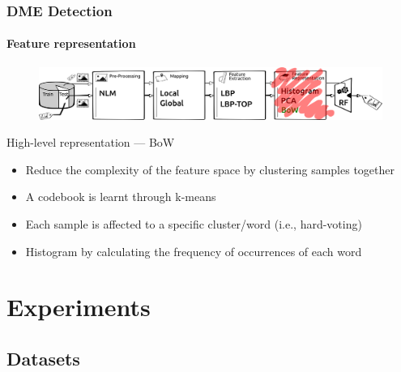 \documentclass{beamer}
\begin{document}
\begin{frame}
  \frametitle{DME Detection}
  \framesubtitle{Feature representation}
  \begin{figure}
    \centering
    \includegraphics[width=.5\textwidth]{./images/ml-r3.png}
  \end{figure}
  \begin{block}{High-level representation --- BoW}
    \begin{itemize}\footnotesize
    \item Reduce the complexity of the feature space by clustering samples together
        \begin{figure}
          \centering
        \end{figure}
    \item<1-> A codebook is learnt through k-means
    \item<2-> Each sample is affected to a specific cluster/word (i.e., hard-voting)
    \item<2-> Histogram by calculating the frequency of occurrences of each word 
    \end{itemize}
  \end{block}
\end{frame}

\section{Experiments}

\subsection{Datasets}
\end{document}
